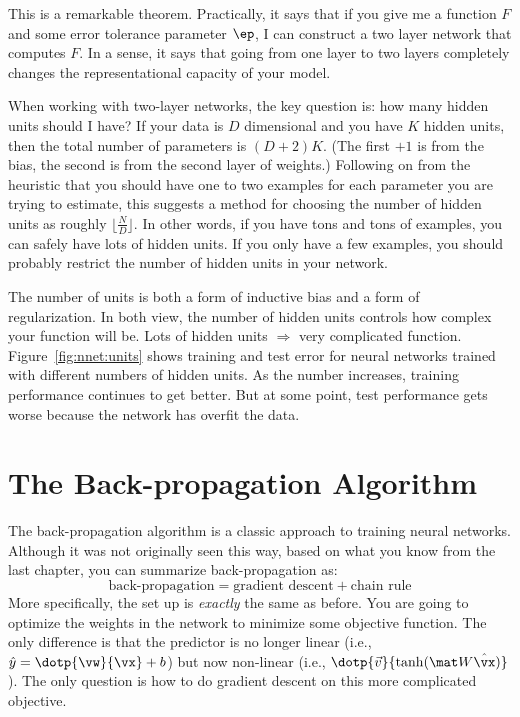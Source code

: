 This is a remarkable theorem.  Practically, it says that if you give
me a function $F$ and some error tolerance parameter $\ep$, I can
construct a two layer network that computes $F$.  In a sense, it says
that going from one layer to two layers completely changes the
representational capacity of your model.

When working with two-layer networks, the key question is: how many
hidden units should I have?  If your data is $D$ dimensional and you
have $K$ hidden units, then the total number of parameters is
$(D+2)K$.  (The first $+1$ is from the bias, the second is from the
second layer of weights.)  Following on from the heuristic that you
should have one to two examples for each parameter you are trying to
estimate, this suggests a method for choosing the number of hidden
units as roughly $\lfloor \frac N D \rfloor$.  In other words, if you
have tons and tons of examples, you can safely have lots of hidden
units.  If you only have a few examples, you should probably restrict
the number of hidden units in your network.

The number of units is both a form of inductive bias and a form of
regularization.  In both view, the number of hidden units controls how
complex your function will be.  Lots of hidden units $\Rightarrow$
very complicated function.  Figure~\ref{fig:nnet:units} shows training
and test error for neural networks trained with different numbers of
hidden units.  As the number increases, training performance continues
to get better.  But at some point, test performance gets worse because
the network has overfit the data.

\section{The Back-propagation Algorithm}

The back-propagation algorithm is a classic approach to training
neural networks.  Although it was not originally seen this way, based
on what you know from the last chapter, you can summarize
back-propagation as:
%
\begin{equation}
\text{back-propagation} = \text{gradient descent} + \text{chain rule}
\end{equation}
%
More specifically, the set up is \emph{exactly} the same as before.
You are going to optimize the weights in the network to minimize some
objective function.  The only difference is that the predictor is no
longer linear (i.e., $\hat y = \dotp{\vw}{\vx}+b$) but now non-linear
(i.e., $\dotp{\vec v}{\tanh( \mat W \hat\vx )}$).  The only question
is how to do gradient descent on this more complicated objective.

